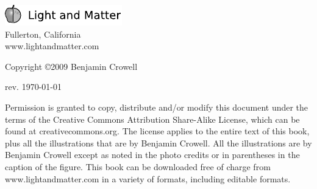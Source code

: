 \thispagestyle{empty}

\vspace{100mm}

\noindent
\includegraphics{cover/lmlogo}\\
Fullerton, California\\
www.lightandmatter.com

\vspace{20mm}
\noindent
Copyright \copyright  2009 Benjamin Crowell

\vspace{20mm}
\noindent
rev. \today{}

\vspace{6mm}
\noindent
Permission is granted to copy, distribute and/or modify this
document under the terms of the Creative Commons Attribution
Share-Alike License, which can be found at creativecommons.org. The license
applies to the entire text of this book, plus all the illustrations
that are by Benjamin Crowell. All the illustrations are by Benjamin
Crowell except as noted in the photo credits or in parentheses
in the caption of the figure.
This book can be downloaded free of charge
from www.lightandmatter.com in a variety of formats,
including editable formats.
